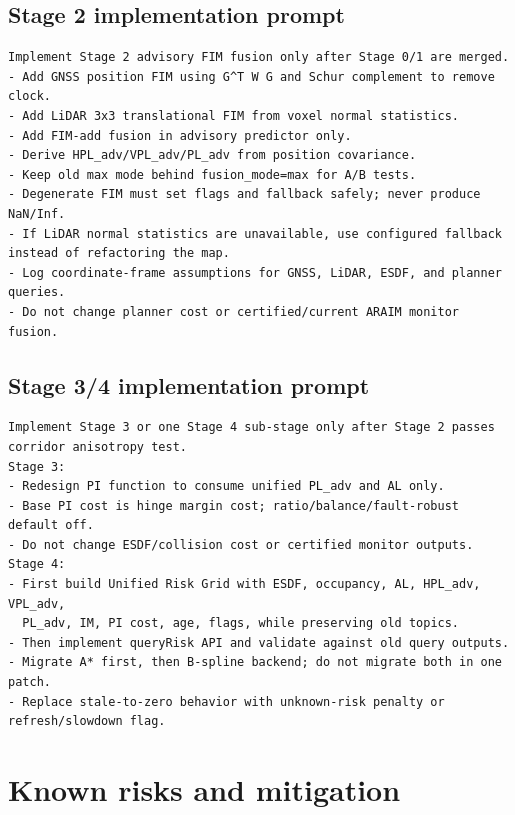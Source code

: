 \documentclass[11pt,a4paper]{article}
\begin{document}
\subsection{Stage 2 implementation prompt}
\begin{lstlisting}
Implement Stage 2 advisory FIM fusion only after Stage 0/1 are merged.
- Add GNSS position FIM using G^T W G and Schur complement to remove clock.
- Add LiDAR 3x3 translational FIM from voxel normal statistics.
- Add FIM-add fusion in advisory predictor only.
- Derive HPL_adv/VPL_adv/PL_adv from position covariance.
- Keep old max mode behind fusion_mode=max for A/B tests.
- Degenerate FIM must set flags and fallback safely; never produce NaN/Inf.
- If LiDAR normal statistics are unavailable, use configured fallback instead of refactoring the map.
- Log coordinate-frame assumptions for GNSS, LiDAR, ESDF, and planner queries.
- Do not change planner cost or certified/current ARAIM monitor fusion.
\end{lstlisting}

\subsection{Stage 3/4 implementation prompt}
\begin{lstlisting}
Implement Stage 3 or one Stage 4 sub-stage only after Stage 2 passes corridor anisotropy test.
Stage 3:
- Redesign PI function to consume unified PL_adv and AL only.
- Base PI cost is hinge margin cost; ratio/balance/fault-robust default off.
- Do not change ESDF/collision cost or certified monitor outputs.
Stage 4:
- First build Unified Risk Grid with ESDF, occupancy, AL, HPL_adv, VPL_adv,
  PL_adv, IM, PI cost, age, flags, while preserving old topics.
- Then implement queryRisk API and validate against old query outputs.
- Migrate A* first, then B-spline backend; do not migrate both in one patch.
- Replace stale-to-zero behavior with unknown-risk penalty or refresh/slowdown flag.
\end{lstlisting}

\section{Known risks and mitigation}
\end{document}
